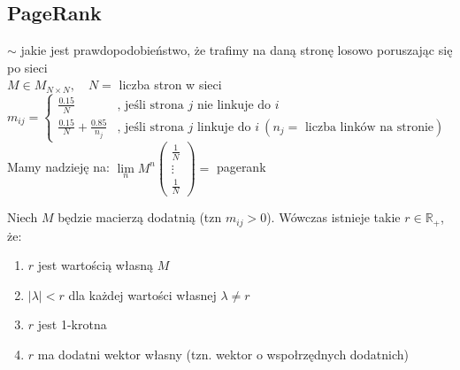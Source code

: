 \subsection{PageRank}
$\sim$ jakie jest prawdopodobieństwo, że trafimy na daną stronę losowo poruszając się po sieci\\ 
$M \in M_{N \times N}, \quad N=$ liczba stron w sieci \\ 
$m_{ij} = \begin{cases} \frac{0.15}{N} & \text{, jeśli strona } j \text{ nie linkuje do } i \\ 
\frac{0.15}{N} + \frac{0.85}{n_j} & \text{, jeśli strona } j \text{ linkuje do } i \ (n_j=\text{ liczba linków na stronie}) \end{cases}$ \\ 
Mamy nadzieję na: 
$ \lim\limits_n M^n \begin{pmatrix} \frac{1}{N} \\ \vdots \\ \frac{1}{N} \end{pmatrix} = $ pagerank
\begin{tw}
    Niech $M$ będzie macierzą dodatnią (tzn $m_{ij} > 0$). Wówczas istnieje takie $r \in \mathbb R_+$, że:
    \begin{enumerate}[(1)]
        \item $r$ jest wartością własną $M$
        \item $ |\lambda| < r$ dla każdej wartości własnej $\lambda \neq r$ 
        \item $r$ jest 1-krotna 
        \item $r$ ma dodatni wektor własny (tzn. wektor o wspołrzędnych dodatnich)
    \end{enumerate} 
\end{tw} 

